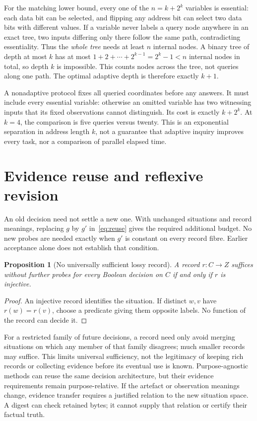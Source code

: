 \documentclass[11pt,letterpaper]{article}
\newtheorem{proposition}[theorem]{Proposition}
\begin{document}
For the matching lower bound, every one of the $n=k+2^k$ variables is essential: each data bit can be selected, and flipping any address bit can select two data bits with different values. If a variable never labels a query node anywhere in an exact tree, two inputs differing only there follow the same path, contradicting essentiality. Thus the \emph{whole tree} needs at least $n$ internal nodes. A binary tree of depth at most $k$ has at most
$1+2+\cdots+2^{k-1}=2^k-1<n$
internal nodes in total, so depth $k$ is impossible. This counts nodes across the tree, not queries along one path. The optimal adaptive depth is therefore exactly $k+1$.

A nonadaptive protocol fixes all queried coordinates before any answers. It must include every essential variable: otherwise an omitted variable has two witnessing inputs that its fixed observations cannot distinguish. Its cost is exactly $k+2^k$. At $k=4$, the comparison is five queries versus twenty. This is an exponential separation in address length $k$, not a guarantee that adaptive inquiry improves every task, nor a comparison of parallel elapsed time.

\section{Evidence reuse and reflexive revision}
An old decision need not settle a new one. With unchanged situations and record meanings, replacing $g$ by $g'$ in~\eqref{eq:reuse} gives the required additional budget. No new probes are needed exactly when $g'$ is constant on every record fibre. Earlier acceptance alone does not establish that condition.

\begin{proposition}[No universally sufficient lossy record]
A record $r:C\to Z$ suffices without further probes for every Boolean decision on $C$ if and only if $r$ is injective.
\end{proposition}
\begin{proof}
An injective record identifies the situation. If distinct $w,v$ have $r(w)=r(v)$, choose a predicate giving them opposite labels. No function of the record can decide it.
\end{proof}

For a restricted family of future decisions, a record need only avoid merging situations on which any member of that family disagrees; much smaller records may suffice. This limits universal sufficiency, not the legitimacy of keeping rich records or collecting evidence before its eventual use is known. Purpose-agnostic methods can reuse the same decision architecture, but their evidence requirements remain purpose-relative. If the artefact or observation meanings change, evidence transfer requires a justified relation to the new situation space. A digest can check retained bytes; it cannot supply that relation or certify their factual truth.
\end{document}

